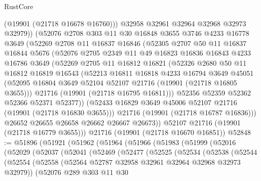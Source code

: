 \begin{lexlean}{RustCore}
\begin{coremodule}
          (@19901 (@21718 @16678 @16760)))
        @32958
        @32961
        @32964
        @32968
        @32973
        @32979))
    (@52076
      @2708
      @303
      @11
      @30
      @16848
      @3655
      @3746
      @4233
      @16778
      @3649
      (@52269
        @2708
        @11
        @16837
        @16846
        (@52305
          @2707
          @50
          @11
          @16837
          @16844
          @5676
          (@52076
            @2705
            @2349
            @11
            @49
            @16823
            @16836
            @16843
            @4233
            @16786
            @3649
            (@52269
              @2705
              @11
              @16812
              @16821
              (@52326
                @2680
                @50
                @11
                @16812
                @16819
                @16543
                (@52213
                  @16811
                  @16818
                  @4233
                  @16794
                  @3649
                  @45051
                  (@52095 @16804 @3649 @52104 @52107 @21716 (@19901 (@21718 @16805 @3655)))
                  @21716
                  (@19901 (@21718 @16795 @16811)))
                @52356
                @52359
                @52362
                @52366
                @52371
                @52377))
            (@52433 @16829 @3649 @45006 @52107 @21716 (@19901 (@21718 @16830 @3655)))
            @21716
            (@19901 (@21718 @16787 @16836)))
          @26652
          @26655
          @26658
          @26662
          @26667
          @26673))
      @52107
      @21716
      (@19901 (@21718 @16779 @3655)))
    @21716
    (@19901 (@21718 @16670 @16851))
@52848 := @51896
    (@51921
      (@51962
        (@51964
          (@51966
            (@51983
              (@51999
                (@52016
                  (@52029
                    (@52037
                      (@52041
                        (@52469
                          (@52477
                            (@52525
                              (@52534
                                (@52538
                                  (@52544
                                    (@52554
                                      (@52558
                                        (@52564 @52787 @32958 @32961 @32964 @32968 @32973 @32979))
                                      (@52076
                                        @289
                                        @303
                                        @11
                                        @30

\end{coremodule}
\end{lexlean}
